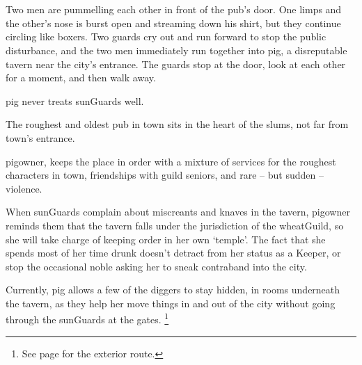 \section{}

\begin{multicols}{2}

\begin{boxtext}
  Two men are pummelling each other in front of the pub's door.
   One limps and the other's nose is burst open and streaming down his shirt, but they continue circling like boxers.
   Two guards cry out and run forward to stop the public disturbance, and the two men immediately run together into \gls{pig}, a disreputable tavern near the city's entrance.
   The guards stop at the door, look at each other for a moment, and then walk away.

\Gls{pig} never treats \glspl{sunGuard} well.
\end{boxtext}
 
The roughest and oldest pub in \gls{town} sits in the heart of the slums, not far from \gls{town}'s entrance.

\Gls{pigowner}, keeps the place in order with a mixture of services for the roughest characters in \gls{town}, friendships with guild seniors, and rare -- but sudden -- violence.

When \glspl{sunGuard} complain about miscreants and knaves in the tavern, \gls{pigowner} reminds them that the tavern falls under the jurisdiction of the \gls{wheatGuild}, so she will take charge of keeping order in her own `temple'.
The fact that she spends most of her time drunk doesn't detract from her status as a Keeper, or stop the occasional noble asking her to sneak contraband into the city.

Currently, \gls{pig} allows a few of the \glspl{digger} to stay hidden, in rooms underneath the tavern, as they help her move things in and out of the city without going through the \glspl{sunGuard} at the gates.%
\footnote{See page \pageref{farmExit} for the exterior route.}



\end{multicols}
